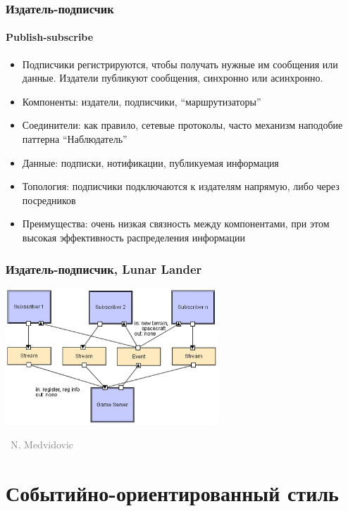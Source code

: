 \documentclass[xetex,mathserif,serif]{beamer}
\newcommand{\attribution}[1] {
    \vspace{-5mm}\begin{flushright}\begin{scriptsize}\textcolor{gray}{\textcopyright\, #1}\end{scriptsize}\end{flushright}
}
\begin{document}
    \begin{frame}
        \frametitle{Издатель-подписчик}
        \framesubtitle{Publish-subscribe}
        \begin{itemize}
            \item Подписчики регистрируются, чтобы получать нужные им сообщения или данные. Издатели публикуют сообщения, синхронно или асинхронно.
            \item Компоненты: издатели, подписчики, ``маршрутизаторы''
            \item Соединители: как правило, сетевые протоколы, часто механизм наподобие паттерна ``Наблюдатель''
            \item Данные: подписки, нотификации, публикуемая информация
            \item Топология: подписчики подключаются к издателям напрямую, либо через посредников
            \item Преимущества: очень низкая связность между компонентами, при этом высокая эффективность распределения информации
        \end{itemize}
    \end{frame}

    \begin{frame}
        \frametitle{Издатель-подписчик, Lunar Lander}
        \begin{center}
            \includegraphics[width=0.6\textwidth]{pubSubLL.png}
            \attribution{N. Medvidovic}
        \end{center}
    \end{frame}

    \section{Событийно-ориентированный стиль}
\end{document}
